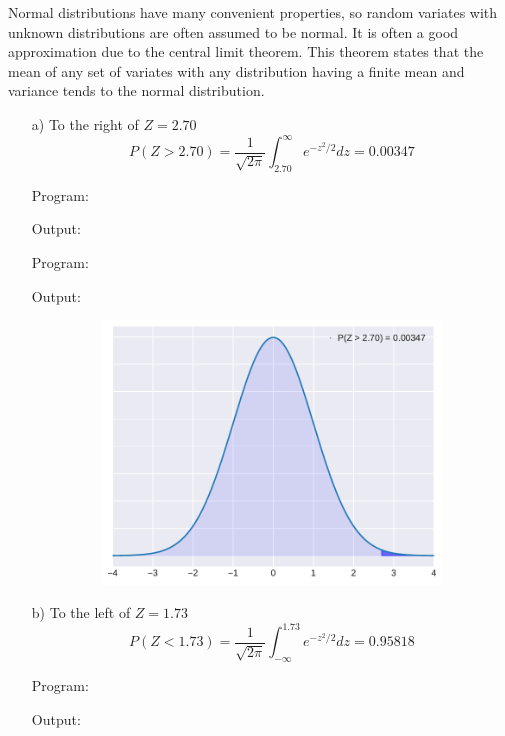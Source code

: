 \documentclass[a4paper,11pt,openright]{report}
\begin{document}
\begin{enumerate}
Normal distributions have many convenient properties, so random variates with unknown
distributions are often assumed to be normal. It is often a good approximation due to the
central limit theorem. This theorem states that the mean of any set of variates with any 
distribution having a finite mean and variance tends to the normal distribution. \\

\pagebreak

\begin{enumerate}

\item[a)] To the right of $Z = 2.70$
\begin{equation*}
P(Z > 2.70) = \frac{1}{\sqrt{2\pi}} \int_{2.70}^{\infty} e^{-z^{2}/2} dz = 0.00347
\end{equation*}

Program:

Output:


Program:

Output:


\begin{figure}[ht!]
\includegraphics[width=14cm,height=7cm,keepaspectratio]{norm1a.pdf}
\centering
\end{figure}

\pagebreak

\item[b)] To the left of $Z = 1.73$
\begin{equation*}
P(Z < 1.73) = \frac{1}{\sqrt{2\pi}} \int_{-\infty}^{1.73} e^{-z^{2}/2} dz = 0.95818
\end{equation*}

Program:

Output:



\end{enumerate}
\end{enumerate}
\end{document}
